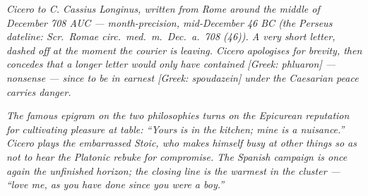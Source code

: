 
\textit{Cicero to C. Cassius Longinus, written from
Rome around the middle of December 708 AUC ---
month-precision, mid-December 46 BC (the Perseus
dateline: \textit{Scr.\ Romae circ.\ med.\ m.\ Dec.\ a.\
708 (46)}). A very short letter, dashed off at the
moment the courier is leaving. Cicero apologises for
brevity, then concedes that a longer letter would only
have contained \textit{[Greek: phluaron]} --- nonsense
--- since to be in earnest \textit{[Greek: spoudazein]}
under the Caesarian peace carries danger.}

\textit{The famous epigram on the two philosophies
turns on the Epicurean reputation for cultivating
pleasure at table: ``Yours is in the kitchen; mine is
a nuisance.'' Cicero plays the embarrassed Stoic, who
makes himself busy at other things so as not to hear
the Platonic rebuke for compromise. The Spanish
campaign is once again the unfinished horizon; the
closing line is the warmest in the cluster --- ``love
me, as you have done since you were a boy.''}
